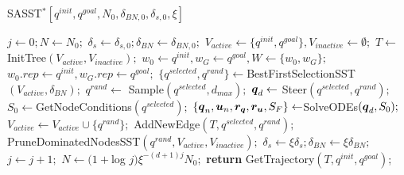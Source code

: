 \begin{algorithm}[htp]
    \caption{SASST$^* [q^{init}, q^{goal}, N_0, \delta_{BN,0}, \delta_{s,0}, \xi]$}\label{alg:SASST*}
    \begin{algorithmic}[1]
        \State $j \gets 0; N \gets N_0;$
        \State $\delta_{s} \gets \delta_{s,0}; \delta_{BN} \gets \delta_{BN,0};$
        \State $V_{active} \gets \{q^{init}, q^{goal}\}, V_{inactive} \gets \emptyset;$
        \State $T \gets$ InitTree$(V_{active}, V_{inactive});$
        \State $w_0 \gets q^{init}, w_G \gets q^{goal}, W \gets \{w_0, w_G\};$
        \State $w_0.rep \gets q^{init}, w_G.rep \gets q^{goal};$
                \State $\{q^{selected}, q^{rand}\} \gets $BestFirstSelectionSST$(V_{active}, \delta_{BN});$
                \State $q^{rand} \gets$ Sample$(q^{selected}, d_{max});$
                \State $\boldsymbol{q}_d \gets$ Steer$({q^{selected}},{q^{rand}});$
                \State $S_0 \gets $GetNodeConditions$({q^{selected}});$
                \State $\left \{\boldsymbol{q}_n, \boldsymbol{u}_n, \boldsymbol{r_q}, \boldsymbol{r_u}, S_F \right \}  \gets $SolveODEs$(\boldsymbol{q}_d, S_0);$
                        \State $V_{active} \gets V_{active} \cup \{q^{rand}\};$
                        \State AddNewEdge$(T, q^{selected}, q^{rand});$
                        \State PruneDominatedNodesSST$(q^{rand}, V_{active}, V_{inactive});$
                    \EndIf
                \EndIf
            \EndFor
            \State $\delta_s \gets \xi\delta_s; \delta_{BN}\gets\xi\delta_{BN};$
            \State $j \gets j+1;$
            \State $N \gets (1+$log $j)\xi^{-(d+1)j}N_0;$
        \EndWhile
        \State \textbf{return} GetTrajectory$(T, q^{init}, q^{goal})$;
    \end{algorithmic}
\end{algorithm}




